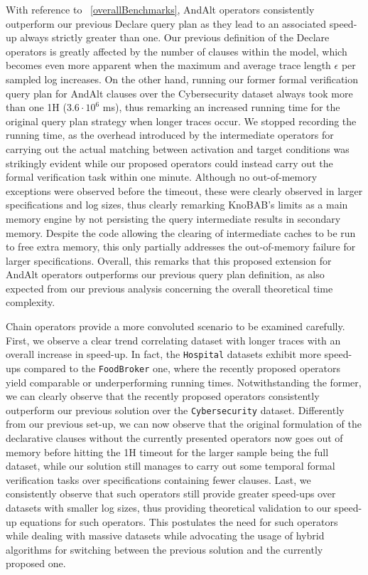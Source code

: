 \documentclass[sigconf]{acmart}
\begin{document}
With reference to \figurename~\ref{overallBenchmarks}, AndAlt operators %
consistently outperform our previous Declare query plan  as they lead to an associated speed-up  always strictly greater than one. Our previous definition of the Declare operators is greatly affected by the number of clauses within the model, which becomes even more apparent when the maximum and average trace length $\epsilon$ per sampled log increases. On the other hand, running our former formal verification query plan for AndAlt clauses  over the Cybersecurity dataset always took more than one 1H ($3.6\cdot 10^6$ ms), thus remarking an increased running time for the original query plan strategy when longer traces occur. We stopped recording the running time, as the overhead introduced by the intermediate operators for carrying out the actual matching between activation and target conditions was strikingly evident while our proposed operators could instead carry out the formal verification task within one minute. Although no out-of-memory exceptions were observed before the timeout, these were clearly observed in larger specifications and log sizes, thus clearly remarking KnoBAB's limits as a main memory engine by not persisting the query intermediate results in secondary memory. Despite the code allowing the clearing of intermediate caches to be run to free extra memory, this only partially addresses the out-of-memory failure for larger specifications. %
Overall, this remarks that this proposed extension for AndAlt operators outperforms our previous query plan definition, as also expected from our previous analysis concerning the overall theoretical time complexity.


Chain operators provide a more convoluted scenario to be examined carefully. First, we observe a clear trend correlating dataset with longer traces with an overall increase in speed-up. In fact, the \texttt{Hospital} datasets exhibit more speed-ups compared to the \texttt{FoodBroker} one, where the recently proposed operators yield comparable or underperforming running times. Notwithstanding the former, we can clearly observe that the recently proposed operators consistently outperform our previous solution over the \texttt{Cybersecurity} dataset. Differently from our previous set-up, we can now observe that the original formulation of the declarative clauses without the currently presented operators now goes out of memory before hitting the 1H timeout for the larger sample being the full dataset, while our solution still manages to carry out some temporal formal verification tasks over specifications containing fewer clauses. Last, we consistently observe that such operators still provide greater speed-ups over datasets with smaller log sizes, thus providing theoretical validation to our speed-up equations for such operators. This postulates the need for such operators while dealing with massive datasets while advocating the usage of hybrid algorithms for switching between the previous solution and the currently proposed one.
\end{document}
